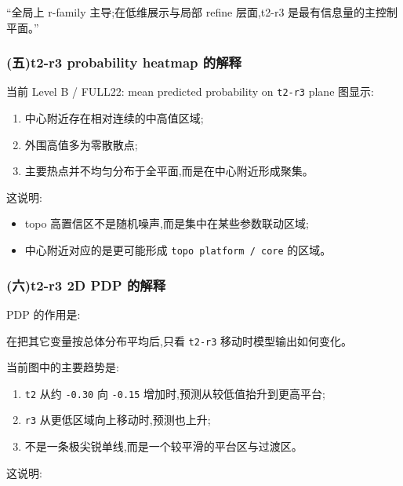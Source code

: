 \documentclass[lang=cn,scheme=chinese,color=blue,device=normal,toc=onecol,math=cm]{elegantbook}
\begin{document}
“全局上 r-family 主导;在低维展示与局部 refine 层面,t2-r3 是最有信息量的主控制平面。”\par


\subsubsection{(五)t2-r3 probability heatmap 的解释}


当前 Level B /\allowbreak{} FULL22: mean predicted probability on \texttt{t2-r3} plane 图显示:\par


\begin{enumerate}
\item 中心附近存在相对连续的中高值区域;
\item 外围高值多为零散散点;
\item 主要热点并不均匀分布于全平面,而是在中心附近形成聚集。
\end{enumerate}


这说明:\par


\begin{itemize}
\item topo 高置信区不是随机噪声,而是集中在某些参数联动区域;
\item 中心附近对应的是更可能形成 \texttt{topo platform /\allowbreak{} core} 的区域。
\end{itemize}


\subsubsection{(六)t2-r3 2D PDP 的解释}


PDP 的作用是:\par


在把其它变量按总体分布平均后,只看 \texttt{t2-r3} 移动时模型输出如何变化。\par


当前图中的主要趋势是:\par


\begin{enumerate}
\item \texttt{t2} 从约 \texttt{-0.30} 向 \texttt{-0.15} 增加时,预测从较低值抬升到更高平台;
\item \texttt{r3} 从更低区域向上移动时,预测也上升;
\item 不是一条极尖锐单线,而是一个较平滑的平台区与过渡区。
\end{enumerate}


这说明:\par
\end{document}
